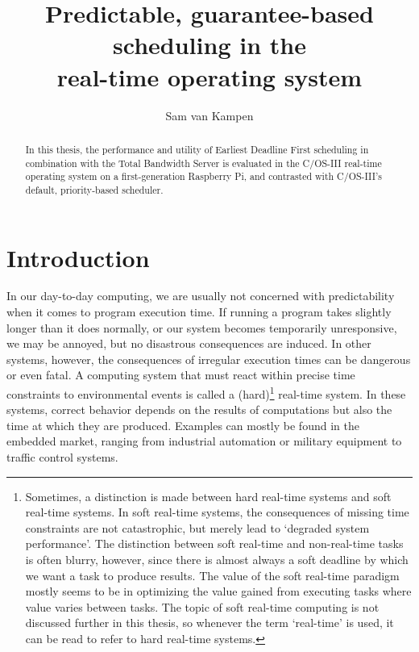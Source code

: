 \documentclass[twoside]{uva-inf-bachelor-thesis}
\title{Predictable, guarantee-based\\ scheduling in the \ucosiii\\ real-time operating system}
\author{Sam van Kampen}
\newcommand{\ucosiii}{\textmu C/OS-III\xspace}
\begin{document}
\maketitle

\begin{abstract}
    In this thesis, the performance and utility of Earliest Deadline First scheduling in combination with the Total Bandwidth Server is evaluated  in the \ucosiii real-time operating system on a first-generation Raspberry Pi, and contrasted with \ucosiii's default, priority-based scheduler.
\end{abstract}

\tableofcontents

%
%
%
%

\chapter{Introduction}
In our day-to-day computing, we are usually not concerned with predictability when it comes to program execution time. If running a program takes slightly longer than it does normally, or our system becomes temporarily unresponsive, we may be annoyed, but no disastrous consequences are induced. In other systems, however, the consequences of irregular execution times can be dangerous or even fatal. A computing system that must react within precise time constraints to environmental events is called a (hard)\footnote{Sometimes, a distinction is made between hard real-time systems and soft real-time systems. In soft real-time systems, the consequences of missing time constraints are not catastrophic, but merely lead to `degraded system performance'. The distinction between soft real-time and non-real-time tasks is often blurry, however, since there is almost always a soft deadline by which we want a task to produce results. The value of the soft real-time paradigm mostly seems to be in optimizing the value gained from executing tasks where value varies between tasks. The topic of soft real-time computing is not discussed further in this thesis, so whenever the term `real-time' is used, it can be read to refer to hard real-time systems.} real-time system\cite{buttazzo2011hard}. In these systems, correct behavior depends on the results of computations but also the time at which they are produced. Examples can mostly be found in the embedded market, ranging from industrial automation or military equipment to traffic control systems.
\end{document}
